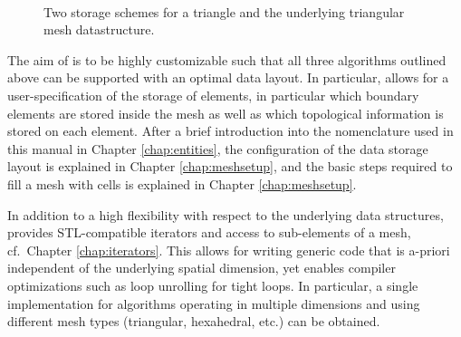 \begin{figure}[bt]
 \centering
\mbox{
 \hspace{0.5cm}
 }
 \caption{Two storage schemes for a triangle and the underlying triangular mesh datastructure.}
 \label{fig:storage-schemes-triangle}
\end{figure}

The aim of {\ViennaGrid} is to be highly customizable such that all three algorithms outlined above can be supported with an optimal data layout.
In particular, {\ViennaGrid} allows for a user-specification of the storage of elements, in particular which boundary elements are stored inside the mesh as well as which topological information is stored on each element.
After a brief introduction into the nomenclature used in this manual in Chapter \ref{chap:entities}, the configuration of the data storage layout is explained in Chapter \ref{chap:meshsetup}, and the basic steps required to fill a mesh with cells is explained in Chapter \ref{chap:meshsetup}.

In addition to a high flexibility with respect to the underlying data structures, {\ViennaGrid} provides STL-compatible iterators and access to sub-elements of a mesh, cf.~Chapter \ref{chap:iterators}.
This allows for writing generic code that is a-priori independent of the underlying spatial dimension, yet enables compiler optimizations such as loop unrolling for tight loops.
In particular, a single implementation for algorithms operating in multiple dimensions and using different mesh types (triangular, hexahedral, etc.) can be obtained.

